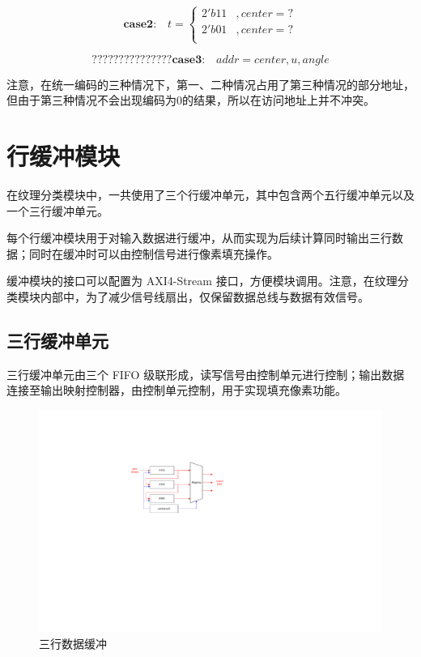 \documentclass[12pt, a4paper, oneside]{ctexbook}
\begin{document}
	$$
	\textbf{case2:} \quad t=
	\begin{cases}
		2'b11 &,center = ? \\
		2'b01 &,center = ? \\
	\end{cases}
	$$
	
	$$
???????????????
	\textbf{case3:} \quad addr={center,u,angle}
	$$
	\par 注意，在统一编码的三种情况下，第一、二种情况占用了第三种情况的部分地址，但由于第三种情况不会出现编码为0的结果，所以在访问地址上并不冲突。	
	
	\section{行缓冲模块}
	在纹理分类模块中，一共使用了三个行缓冲单元，其中包含两个五行缓冲单元以及一个三行缓冲单元。\par 每个行缓冲模块用于对输入数据进行缓冲，从而实现为后续计算同时输出三行数据；同时在缓冲时可以由控制信号进行像素填充操作。\par 	缓冲模块的接口可以配置为 AXI4-Stream 接口，方便模块调用。注意，在纹理分类模块内部中，为了减少信号线扇出，仅保留数据总线与数据有效信号。
	\subsection{三行缓冲单元}
	三行缓冲单元由三个 FIFO 级联形成，读写信号由控制单元进行控制；输出数据连接至输出映射控制器，由控制单元控制，用于实现填充像素功能。
		\begin{figure}[h]	
		\centering
		\includegraphics[scale=1]{pic/fifo_3.pdf}
		\caption{三行数据缓冲}
		\end{figure}	
\end{document}
